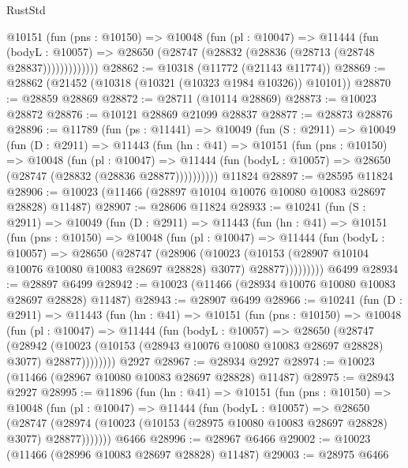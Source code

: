 \begin{lexlean}{RustStd}
\begin{coremodule}
            @10151
              (fun (pns : @10150) =>
              @10048
                (fun (pl : @10047) =>
                @11444
                  (fun (bodyL : @10057) =>
                  @28650 (@28747 (@28832 (@28836 (@28713 (@28748 @28837)))))))))))))
@28862 := @10318 (@11772 (@21143 @11774))
@28869 := @28862 (@21452 (@10318 (@10321 (@10323 @1984 @10326)) @10101))
@28870 := @28859 @28869
@28872 := @28711 (@10114 @28869)
@28873 := @10023 @28872
@28876 := @10121 @28869 @21099 @28837
@28877 := @28873 @28876
@28896 := @11789
    (fun (ps : @11441) =>
    @10049
      (fun (S : @2911) =>
      @10049
        (fun (D : @2911) =>
        @11443
          (fun (hn : @41) =>
          @10151
            (fun (pns : @10150) =>
            @10048
              (fun (pl : @10047) =>
              @11444 (fun (bodyL : @10057) => @28650 (@28747 (@28832 (@28836 @28877))))))))))
    @11824
@28897 := @28595 @11824
@28906 := @10023 (@11466 (@28897 @10104 @10076 @10080 @10083 @28697 @28828) @11487)
@28907 := @28606 @11824
@28933 := @10241
    (fun (S : @2911) =>
    @10049
      (fun (D : @2911) =>
      @11443
        (fun (hn : @41) =>
        @10151
          (fun (pns : @10150) =>
          @10048
            (fun (pl : @10047) =>
            @11444
              (fun (bodyL : @10057) =>
              @28650
                (@28747
                  (@28906
                    (@10023
                      (@10153 (@28907 @10104 @10076 @10080 @10083 @28697 @28828) @3077)
                      @28877)))))))))
    @6499
@28934 := @28897 @6499
@28942 := @10023 (@11466 (@28934 @10076 @10080 @10083 @28697 @28828) @11487)
@28943 := @28907 @6499
@28966 := @10241
    (fun (D : @2911) =>
    @11443
      (fun (hn : @41) =>
      @10151
        (fun (pns : @10150) =>
        @10048
          (fun (pl : @10047) =>
          @11444
            (fun (bodyL : @10057) =>
            @28650
              (@28747
                (@28942
                  (@10023 (@10153 (@28943 @10076 @10080 @10083 @28697 @28828) @3077) @28877))))))))
    @2927
@28967 := @28934 @2927
@28974 := @10023 (@11466 (@28967 @10080 @10083 @28697 @28828) @11487)
@28975 := @28943 @2927
@28995 := @11896
    (fun (hn : @41) =>
    @10151
      (fun (pns : @10150) =>
      @10048
        (fun (pl : @10047) =>
        @11444
          (fun (bodyL : @10057) =>
          @28650
            (@28747
              (@28974 (@10023 (@10153 (@28975 @10080 @10083 @28697 @28828) @3077) @28877)))))))
    @6466
@28996 := @28967 @6466
@29002 := @10023 (@11466 (@28996 @10083 @28697 @28828) @11487)
@29003 := @28975 @6466

\end{coremodule}
\end{lexlean}
